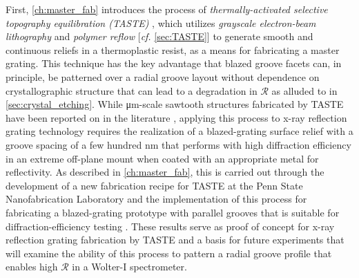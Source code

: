 First, \cref{ch:master_fab} introduces the process of \emph{thermally-activated selective topography equilibration (TASTE)} \cite{Schleunitz14}, which utilizes \emph{grayscale electron-beam lithography} and \emph{polymer reflow} [\emph{cf.\@} \cref{sec:TASTE}] to generate smooth and continuous reliefs in a thermoplastic resist, as a means for fabricating a master grating. %
This technique has the key advantage that blazed groove facets can, in principle, be patterned over a radial groove layout without dependence on crystallographic structure that can lead to a degradation in $\mathscr{R}$ as alluded to in \cref{sec:crystal_etching}. 
While \si{\um}-scale sawtooth structures fabricated by TASTE have been reported on in the literature \cite{Schleunitz10,Schleunitz14,Kirchner16,Kirchner19}, applying this process to x-ray reflection grating technology requires the realization of a blazed-grating surface relief with a groove spacing of a few hundred \si{\nm} that performs with high diffraction efficiency in an extreme off-plane mount when coated with an appropriate metal for reflectivity. 
As described in \cref{ch:master_fab}, this is carried out through the development of a new fabrication recipe for TASTE at the Penn State Nanofabrication Laboratory \cite{PSU_MRI_nanofab} and the implementation of this process for fabricating a blazed-grating prototype with parallel grooves that is suitable for diffraction-efficiency testing \cite{McCoy18,McCoy20}. 
These results serve as proof of concept for x-ray reflection grating fabrication by TASTE and a basis for future experiments that will examine the ability of this process to pattern a radial groove profile that enables high $\mathscr{R}$ in a Wolter-I spectrometer. 

